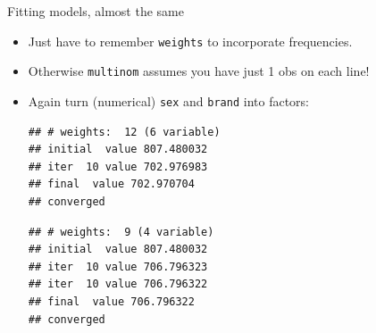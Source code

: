 \begin{frame}[fragile]{Fitting models, almost the same}

  \begin{itemize}
  \item Just have to remember \texttt{weights} to incorporate
frequencies.
\item Otherwise \texttt{multinom} assumes you have just 1 obs
on each line!
\item Again turn (numerical) \texttt{sex} and \texttt{brand} into factors:
{\small
 
\begin{knitrout}
\color{fgcolor}\begin{kframe}
\begin{alltt}
\hlopt{$}\hlkwb{=}\hlopt{$}
\hlopt{$}\hlkwb{=}\hlopt{$}
\hlkwb{=}\hlopt{~}\hlopt{+}
\end{alltt}
\begin{verbatim}
## # weights:  12 (6 variable)
## initial  value 807.480032 
## iter  10 value 702.976983
## final  value 702.970704 
## converged
\end{verbatim}
\begin{alltt}
\hlkwb{=}\hlopt{~}
\end{alltt}
\begin{verbatim}
## # weights:  9 (4 variable)
## initial  value 807.480032 
## iter  10 value 706.796323
## iter  10 value 706.796322
## final  value 706.796322 
## converged
\end{verbatim}
\end{kframe}
\end{knitrout}
}  

  \end{itemize}

  
\end{frame}

